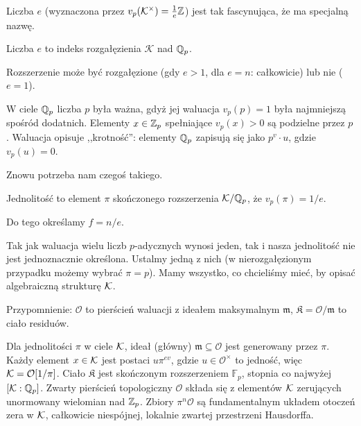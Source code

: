 Liczba $e$ (wyznaczona przez $v_p(\mathcal K^\times) = \textstyle \frac 1 e \mathbb Z$) jest tak fascynująca, że ma specjalną nazwę.

\begin{definicja}
	Liczba $e$ to indeks rozgałęzienia $\mathcal K$ nad $\mathbb Q_p$.
\end{definicja} 

Rozszerzenie może być rozgałęzione (gdy $e > 1$, dla $e = n$: całkowicie) lub nie ($e = 1$).

W ciele $\mathbb Q_p$ liczba $p$ była ważna, gdyż jej waluacja $v_p(p) = 1$ była najmniejszą spośród dodatnich.
Elementy $x \in \mathbb Z_p$ spełniające $v_p(x) > 0$ są podzielne przez $p$.
Waluacja opisuje ,,krotność'': elementy $\mathbb Q_p$ zapisują się jako $p^v \cdot u$, gdzie $v_p(u) = 0$.

Znowu potrzeba nam czegoś takiego.

\begin{definicja}
	Jednolitość to element $\pi$ skończonego rozszerzenia $\mathcal K / \mathbb Q_p$, że $v_p(\pi) = 1/e$.
\end{definicja}

Do tego określamy $f = n/e$.

Tak jak waluacja wielu liczb $p$-adycznych wynosi jeden, tak i nasza jednolitość nie jest jednoznacznie określona.
Ustalmy jedną z nich (w nierozgałęzionym przypadku możemy wybrać $\pi = p$).
Mamy wszystko, co chcieliśmy mieć, by opisać algebraiczną strukturę $\mathcal K$.

Przypomnienie: $\mathcal O$ to pierścień waluacji z ideałem maksymalnym $\mathfrak m$, $\mathfrak K = \mathcal O / \mathfrak m$ to ciało residuów.

\begin{fakt}
	Dla jednolitości $\pi$ w ciele $\mathcal K$, ideał (główny) $\mathfrak m \subseteq \mathcal O$ jest generowany przez $\pi$.
	Każdy element $x \in \mathcal K$ jest postaci $u\pi^{ev}$, gdzie $u \in \mathcal O^\times$ to jedność, więc $\mathcal K = \mathcal O[1 / \pi]$.
	Ciało $\mathfrak K$ jest skończonym rozszerzeniem $\mathbb F_p$, stopnia co najwyżej $[\mathcal K : \mathbb Q_p]$.
	Zwarty pierścień topologiczny $\mathcal O$ składa się z elementów $\mathcal K$ zerujących unormowany wielomian nad $\mathbb Z_p$.
	Zbiory $\pi^n \mathcal O$ są fundamentalnym układem otoczeń zera w $\mathcal K$, całkowicie niespójnej, lokalnie zwartej przestrzeni Hausdorffa.
\end{fakt}

